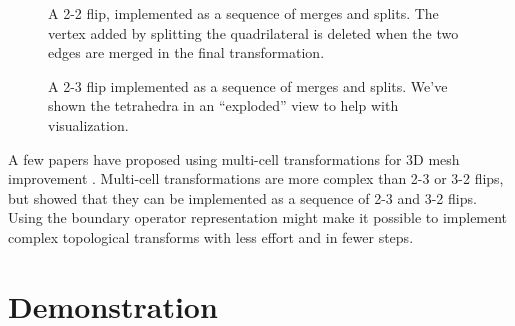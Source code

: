 \documentclass[twocolumn]{article}
\begin{document}
\begin{figure}[h]
\begin{center}
    \end{center}
    \caption{A 2-2 flip, implemented as a sequence of merges and splits.
    The vertex added by splitting the quadrilateral is deleted when the two edges are merged in the final transformation.}
    \label{fig:2-2-flip}
\end{figure}

\begin{figure}[h]
    \begin{center}
        
    \end{center}
    \caption{A 2-3 flip implemented as a sequence of merges and splits.
    We've shown the tetrahedra in an ``exploded'' view to help with visualization.}
    \label{fig:2-3-flip}
\end{figure}

A few papers have proposed using multi-cell transformations for 3D mesh improvement \cite{klingner2008aggressive}.
Multi-cell transformations are more complex than 2-3 or 3-2 flips, but \cite{misztal2009tetrahedral} showed that they can be implemented as a sequence of 2-3 and 3-2 flips.
Using the boundary operator representation might make it possible to implement complex topological transforms with less effort and in fewer steps.


\section{Demonstration}
\end{document}

